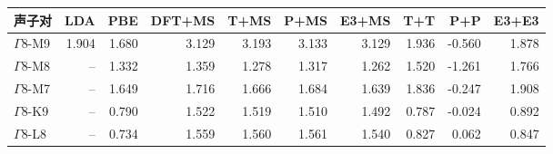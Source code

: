 \begin{tabular}{lrrrrrrrrr}
\toprule
声子对 & LDA & PBE & DFT+MS & T+MS & P+MS & E3+MS & T+T & P+P & E3+E3 \\
\midrule
$\Gamma$8-M9 & 1.904 & 1.680 & 3.129 & 3.193 & 3.133 & 3.129 & 1.936 & -0.560 & 1.878 \\
$\Gamma$8-M8 & -- & 1.332 & 1.359 & 1.278 & 1.317 & 1.262 & 1.520 & -1.261 & 1.766 \\
$\Gamma$8-M7 & -- & 1.649 & 1.716 & 1.666 & 1.684 & 1.639 & 1.836 & -0.247 & 1.908 \\
$\Gamma$8-K9 & -- & 0.790 & 1.522 & 1.519 & 1.510 & 1.492 & 0.787 & -0.024 & 0.892 \\
$\Gamma$8-L8 & -- & 0.734 & 1.559 & 1.560 & 1.561 & 1.540 & 0.827 & 0.062 & 0.847 \\
\bottomrule
\end{tabular}
